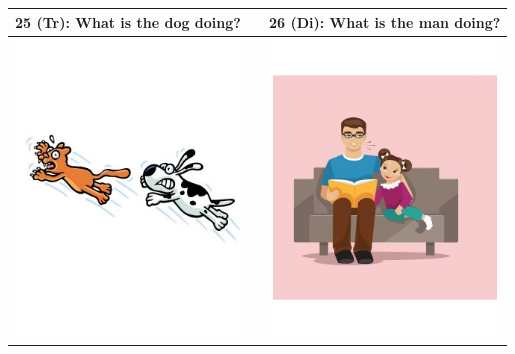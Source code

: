 \documentclass[12pt,notitlepage]{article}
\begin{document}
\begin{center}
\begin{tabular}{|c|c|c|}
\hline
25 (Tr): What is the dog doing? && 26 (Di): What is the man doing? \\
\hline
\includegraphics[width=16em,trim=0 0 0 -3]{figures/I25.jpg} & & \includegraphics[width=16em,trim=0 0 0 -3]{figures/I26.jpg} \\
\hline
\end{tabular}
\vspace{1em} \\



\end{center}
\end{document}
